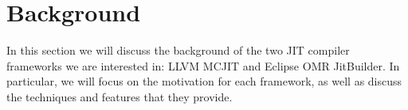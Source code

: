 \section{Background}
In this section we will discuss the background of the two JIT compiler frameworks we are interested in: LLVM MCJIT and Eclipse OMR JitBuilder.
In particular, we will focus on the motivation for each framework, as well as discuss the techniques and features that they provide.

